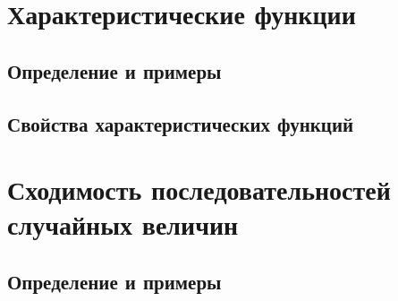 \section{Характеристические функции}

\subsection{Определение и примеры}


\subsection{Свойства характеристических функций}




\section{Сходимость последовательностей случайных величин}

\subsection{Определение и примеры}
